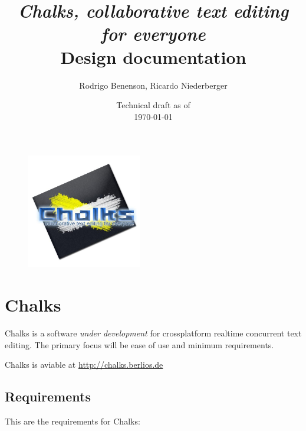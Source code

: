 \documentclass{report}
\title{\large \emph{Chalks, collaborative text editing for everyone} \\ \huge Design documentation}
\author{Rodrigo Benenson, Ricardo Niederberger}
\date{Technical draft as of\\ \today}
\begin{document}
\begin{figure}[!t]
 \begin{center}
    \includegraphics[angle=0,width=5cm]{schemas/logo.jpg}
 \end{center}
\end{figure}


\maketitle
\thispagestyle{empty}

\newpage
\setcounter{page}{1}


\tableofcontents
\newpage
% 

\chapter{Chalks}


Chalks is a software \emph{under development} for crossplatform realtime concurrent text editing.
The primary focus will be ease of use and minimum requirements.


Chalks is aviable at \url{http://chalks.berlios.de}


\section{Requirements}

This are the requirements for Chalks:
\end{document}

